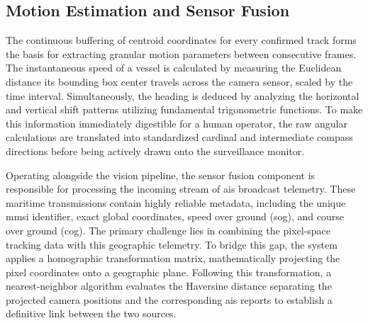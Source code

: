 \subsection{Motion Estimation and Sensor Fusion}

The continuous buffering of centroid coordinates for every confirmed track forms the basis for extracting granular motion parameters between consecutive frames. The instantaneous speed of a vessel is calculated by measuring the Euclidean distance its bounding box center travels across the camera sensor, scaled by the time interval. Simultaneously, the heading is deduced by analyzing the horizontal and vertical shift patterns utilizing fundamental trigonometric functions. To make this information immediately digestible for a human operator, the raw angular calculations are translated into standardized cardinal and intermediate compass directions before being actively drawn onto the surveillance monitor.

Operating alongside the vision pipeline, the sensor fusion component is responsible for processing the incoming stream of \gls{ais} broadcast telemetry. These maritime transmissions contain highly reliable metadata, including the unique \gls{mmsi} identifier, exact global coordinates, speed over ground (\gls{sog}), and course over ground (\gls{cog}). The primary challenge lies in combining the pixel-space tracking data with this geographic telemetry. To bridge this gap, the system applies a homographic transformation matrix, mathematically projecting the pixel coordinates onto a geographic plane. Following this transformation, a nearest-neighbor algorithm evaluates the Haversine distance separating the projected camera positions and the corresponding \gls{ais} reports to establish a definitive link between the two sources.

